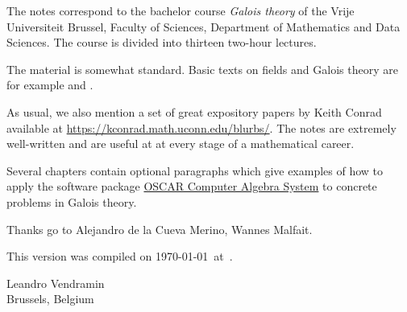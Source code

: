 \preface

The notes correspond to the bachelor 
course \emph{Galois theory} of the 
Vrije Universiteit Brussel, 
Faculty of Sciences, 
Department of Mathematics and Data Sciences. The course
is divided into thirteen two-hour lectures. 

The material is somewhat standard. Basic texts on fields and Galois theory 
are for example \cite{MR1645586} and 
\cite{MR3379917}. 

As usual, we also mention a set of great expository papers by 
Keith Conrad available at 
\url{https://kconrad.math.uconn.edu/blurbs/}. 
The notes are extremely well-written and are useful at  
at every stage of a mathematical career. 

Several chapters contain optional paragraphs which give examples of 
how to apply the software package \href{https://oscar.computeralgebra.de/
}{OSCAR Computer Algebra System}
to concrete problems in Galois theory. 

 
Thanks go to Alejandro de la Cueva Merino, Wannes Malfait. 

This version 
was compiled on \today~at~\currenttime.

\bigskip
\begin{flushright}
Leandro Vendramin\\Brussels, Belgium\par
\end{flushright}
